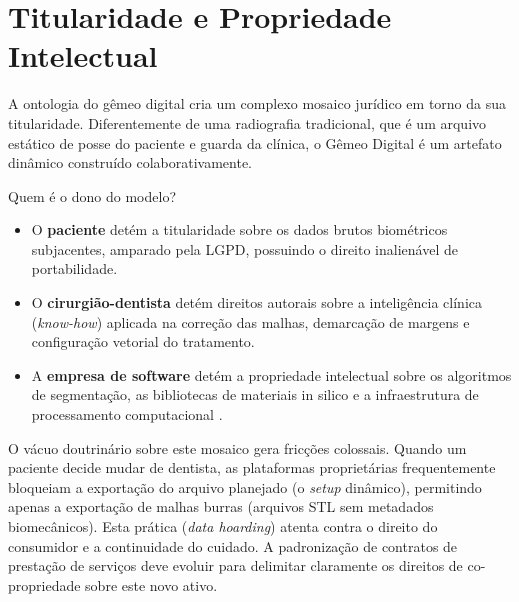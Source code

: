 \section{Titularidade e Propriedade Intelectual}
\label{sec:propriedade-intelectual}

A ontologia do gêmeo digital cria um complexo mosaico jurídico em torno da sua titularidade. Diferentemente de uma radiografia tradicional, que é um arquivo estático de posse do paciente e guarda da clínica, o Gêmeo Digital é um artefato dinâmico construído colaborativamente.

Quem é o dono do modelo?
\begin{itemize}
    \item O \textbf{paciente} detém a titularidade sobre os dados brutos biométricos subjacentes, amparado pela LGPD, possuindo o direito inalienável de portabilidade.
    \item O \textbf{cirurgião-dentista} detém direitos autorais sobre a inteligência clínica (\textit{know-how}) aplicada na correção das malhas, demarcação de margens e configuração vetorial do tratamento.
    \item A \textbf{empresa de software} detém a propriedade intelectual sobre os algoritmos de segmentação, as bibliotecas de materiais in silico e a infraestrutura de processamento computacional \cite{mdpi2025digital}.
\end{itemize}

O vácuo doutrinário sobre este mosaico gera fricções colossais. Quando um paciente decide mudar de dentista, as plataformas proprietárias frequentemente bloqueiam a exportação do arquivo planejado (o \textit{setup} dinâmico), permitindo apenas a exportação de malhas burras (arquivos STL sem metadados biomecânicos). Esta prática (\textit{data hoarding}) atenta contra o direito do consumidor e a continuidade do cuidado. A padronização de contratos de prestação de serviços deve evoluir para delimitar claramente os direitos de co-propriedade sobre este novo ativo.
